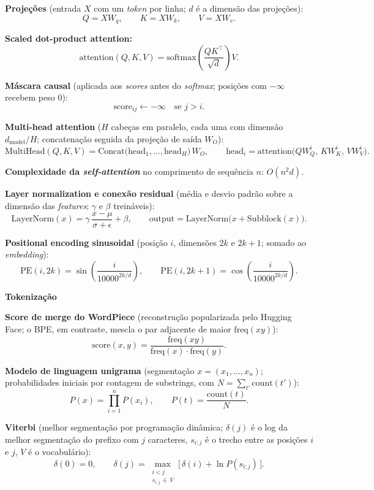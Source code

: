 \documentclass[11pt,a4paper]{article}
\newcommand{\bloco}[1]{%
  \par\vspace{0.3em}%
  {\bfseries\large #1}\par%
  \vspace{-0.4em}{\color{gray!60}\rule{\linewidth}{0.4pt}}\par%
}
\begin{document}
\textbf{Projeções} (entrada $X$ com um \textit{token} por linha; $d$ é a dimensão das projeções):
\[
  Q = X W_q, \qquad K = X W_k, \qquad V = X W_v.
\]

\textbf{Scaled dot-product attention:}
\[
  \mathrm{attention}(Q, K, V) = \mathrm{softmax}\!\left(\frac{Q K^{\top}}{\sqrt{d}}\right) V.
\]

\textbf{Máscara causal} (aplicada aos \textit{scores} antes do \textit{softmax}; posições com $-\infty$ recebem peso $0$):
\[
  \text{score}_{ij} \leftarrow -\infty \quad \text{se } j > i.
\]

\textbf{Multi-head attention} ($H$ cabeças em paralelo, cada uma com dimensão $d_{\text{model}}/H$; concatenação seguida da projeção de saída $W_O$):
\[
  \mathrm{MultiHead}(Q, K, V) = \mathrm{Concat}\bigl(\mathrm{head}_1, \dots, \mathrm{head}_H\bigr)\, W_O,
  \qquad
  \mathrm{head}_i = \mathrm{attention}\bigl(Q W_Q^{i},\, K W_K^{i},\, V W_V^{i}\bigr).
\]

\textbf{Complexidade da \textit{self-attention}} no comprimento de sequência $n$: $O(n^{2} d)$.

\textbf{Layer normalization e conexão residual} (média e desvio padrão sobre a dimensão das \textit{features}; $\gamma$ e $\beta$ treináveis):
\[
  \mathrm{LayerNorm}(x) = \gamma\,\frac{x - \mu}{\sigma + \epsilon} + \beta,
  \qquad
  \text{output} = \mathrm{LayerNorm}\bigl(x + \mathrm{Subblock}(x)\bigr).
\]

\textbf{Positional encoding sinusoidal} (posição $i$, dimensões $2k$ e $2k{+}1$; somado ao \textit{embedding}):
\[
  \mathrm{PE}(i, 2k) = \sin\!\left(\frac{i}{10000^{2k/d}}\right),
  \qquad
  \mathrm{PE}(i, 2k{+}1) = \cos\!\left(\frac{i}{10000^{2k/d}}\right).
\]

\bloco{Tokenização}

\textbf{Score de merge do WordPiece} (reconstrução popularizada pelo Hugging Face; o BPE, em contraste, mescla o par adjacente de maior $\mathrm{freq}(xy)$):
\[
  \mathrm{score}(x, y) = \frac{\mathrm{freq}(xy)}{\mathrm{freq}(x)\cdot\mathrm{freq}(y)}.
\]

\textbf{Modelo de linguagem unigrama} (segmentação $x = (x_1, \dots, x_n)$; probabilidades iniciais por contagem de substrings, com $N = \sum_{t'} \mathrm{count}(t')$):
\[
  P(x) = \prod_{i=1}^{n} P(x_i),
  \qquad
  P(t) = \frac{\mathrm{count}(t)}{N}.
\]

\textbf{Viterbi} (melhor segmentação por programação dinâmica; $\delta(j)$ é o log da melhor segmentação do prefixo com $j$ caracteres, $s_{i:j}$ é o trecho entre as posições $i$ e $j$, $V$ é o vocabulário):
\[
  \delta(0) = 0,
  \qquad
  \delta(j) = \max_{\substack{i < j \\ s_{i:j}\,\in\,V}} \bigl[\, \delta(i) + \ln P(s_{i:j}) \,\bigr].
\]
\end{document}
